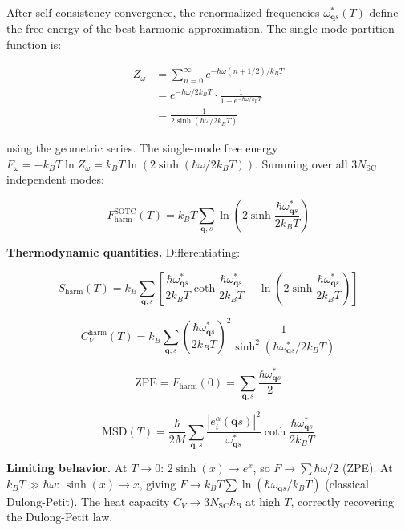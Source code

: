 \documentclass[aps,prb,reprint,amsmath,amssymb,floatfix]{revtex4-2}
\begin{document}
After self-consistency convergence, the renormalized frequencies
\(\omega_{\mathbf{q}s}^*(T)\) define the free energy of the best
harmonic approximation. The single-mode partition function is:

\begin{align*}
Z_\omega
  &= \sum_{n=0}^\infty e^{-\hbar\omega(n+1/2)/k_BT} \\
  &= e^{-\hbar\omega/2k_BT}\cdot\frac{1}{1-e^{-\hbar\omega/k_BT}} \\
  &= \frac{1}{2\sinh(\hbar\omega/2k_BT)}
\end{align*}

using the geometric series. The single-mode free energy
\(F_\omega = -k_BT\ln Z_\omega = k_BT\ln(2\sinh(\hbar\omega/2k_BT))\).
Summing over all \(3N_\text{SC}\) independent modes:

\begin{equation*}
\boxed{F_\text{harm}^\text{SOTC}(T) = k_BT\sum_{\mathbf{q},s}\ln\!\left(2\sinh\frac{\hbar\omega_{\mathbf{q}s}^*}{2k_BT}\right)}
\end{equation*}

\textbf{Thermodynamic quantities.} Differentiating:

\begin{equation*}
S_\text{harm}(T) = k_B\sum_{\mathbf{q},s}\left[\frac{\hbar\omega_{\mathbf{q}s}^*}{2k_BT}\coth\frac{\hbar\omega_{\mathbf{q}s}^*}{2k_BT} - \ln\!\left(2\sinh\frac{\hbar\omega_{\mathbf{q}s}^*}{2k_BT}\right)\right]
\end{equation*}

\begin{equation*}
C_V^\text{harm}(T) = k_B\sum_{\mathbf{q},s}\left(\frac{\hbar\omega_{\mathbf{q}s}^*}{2k_BT}\right)^2\frac{1}{\sinh^2\!\left(\hbar\omega_{\mathbf{q}s}^*/2k_BT\right)}
\end{equation*}

\begin{equation*}
\text{ZPE} = F_\text{harm}(0) = \sum_{\mathbf{q},s}\frac{\hbar\omega_{\mathbf{q}s}^*}{2}
\end{equation*}

\begin{equation*}
\text{MSD}(T) = \frac{\hbar}{2M}\sum_{\mathbf{q},s}\frac{|e_i^\alpha(\mathbf{q}s)|^2}{\omega_{\mathbf{q}s}^*}\coth\frac{\hbar\omega_{\mathbf{q}s}^*}{2k_BT}
\end{equation*}

\textbf{Limiting behavior.} At \(T\to 0\): \(2\sinh(x)\to e^x\), so
\(F\to\sum\hbar\omega/2\) (ZPE). At \(k_BT\gg\hbar\omega\):
\(\sinh(x)\to x\), giving
\(F\to k_BT\sum\ln(\hbar\omega_{\mathbf{q}s}/k_BT)\) (classical
Dulong-Petit). The heat capacity \(C_V\to 3N_\text{SC}k_B\) at high
\(T\), correctly recovering the Dulong-Petit law.
\end{document}
